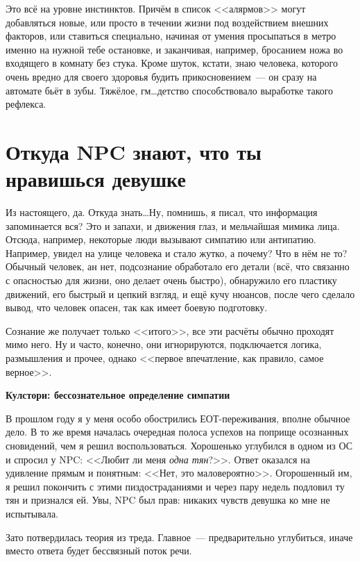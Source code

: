 \documentclass[a4paper,14pt,oneside]{memoir}
\begin{document}
Это всё на уровне инстинктов. Причём в список <<алярмов>> могут добавляться новые, или просто в течении жизни под воздействием внешних факторов, или ставиться специально, начиная от умения просыпаться в метро именно на нужной тебе остановке, и заканчивая, например, бросанием ножа во входящего в комнату без стука. Кроме шуток, кстати, знаю человека, которого очень вредно для своего здоровья будить прикосновением~--- он сразу на автомате бьёт в зубы. Тяжёлое, гм\ldots детство способствовало выработке такого рефлекса. 


\section{Откуда NPC знают, что ты нравишься девушке}

\medskip
Из настоящего, да. Откуда знать\ldots Ну, помнишь, я писал, что информация запоминается вся? Это и запахи, и движения глаз, и мельчайшая мимика лица. Отсюда, например, некоторые люди вызывают симпатию или антипатию. Например, увидел на улице человека и стало жутко, а почему? Что в нём не то? Обычный человек, ан нет, подсознание обработало его детали (всё, что связанно с опасностью для жизни, оно делает очень быстро), обнаружило его пластику движений, его быстрый и цепкий взгляд, и ещё кучу нюансов, после чего сделало вывод, что человек опасен, так как имеет боевую подготовку.

Сознание же получает только <<итого>>, все эти расчёты обычно проходят мимо него. Ну и часто, конечно, они игнорируются, подключается логика, размышления и прочее, однако <<первое впечатление, как правило, самое верное>>.

\begin{shaded}

\begin{center}
\Large\bfseries{Кулстори: бессознательное определение симпатии}
\end{center}

В прошлом году я у меня особо обострились ЕОТ-переживания, вполне обычное дело. В то же время началась очередная полоса успехов на поприще осознанных сновидений, чем я решил воспользоваться. Хорошенько углубился в одном из ОС и спросил у NPC: <<Любит ли меня \textit{одна тян}?>>. Ответ оказался на удивление прямым и понятным: <<Нет, это маловероятно>>. Огорошенный им, я решил покончить с этими пиздостраданиями и через пару недель подловил ту тян и признался ей. Увы, NPC был прав: никаких чувств девушка ко мне не испытывала. 

Зато потвердилась теория из треда. Главное~--- предварительно углубиться, иначе вместо ответа будет бессвязный поток речи.

\end{shaded}
\end{document}
